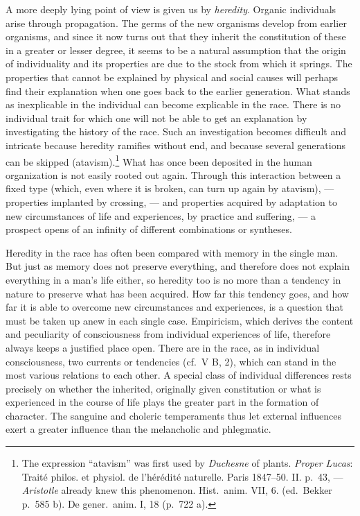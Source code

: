 \documentclass[12pt,a4paper]{book}
\newcommand{\opage}[1]{\marginnote{\footnotesize\textit{[#1]}}}
\begin{document}
A more deeply lying point of view is given us by \emph{heredity}. Organic
individuals arise through propagation. The germs of the new organisms
develop from earlier organisms, and since
\opage{408}it now turns out that they inherit the constitution of these
in a greater or lesser degree, it seems to be a natural assumption that
the origin of individuality and its properties are due to the stock from
which it springs. The properties that cannot be explained by physical and
social causes will perhaps find their explanation when one goes back to
the earlier generation. What stands as inexplicable in the individual can
become explicable in the race. There is no individual trait for which one
will not be able to get an explanation by investigating the history of
the race. Such an investigation becomes difficult and intricate because
heredity ramifies without end, and because several generations can be
skipped
(atavism).\footnote{The expression ``atavism'' was first used by
\emph{Duchesne} of plants. \emph{Proper Lucas}: Traité philos. et
physiol. de l’hérédité naturelle. Paris 1847--50. II. p.~43, ---
\emph{Aristotle} already knew this phenomenon. Hist.\ anim. VII, 6. (ed.\
Bekker p.~585 b). De gener.\ anim. I, 18 (p.~722 a).} What has once been
deposited in the human organization is not easily rooted out again.
Through this interaction between a fixed type (which, even where it is
broken, can turn up again by atavism), --- properties implanted by
crossing, --- and properties acquired by adaptation to new circumstances
of life and experiences, by practice and suffering, --- a prospect opens
of an infinity of different combinations or syntheses.

Heredity in the race has often been compared with memory in the single
man. But just as memory does not preserve everything, and therefore does
not explain everything in a man's life either, so heredity too is no more
than a tendency in nature to preserve what has been acquired. How far this
tendency goes, and how far it is able to overcome new circumstances and
experiences, is a question that must be taken up anew in each single
case. Empiricism, which derives the content and peculiarity of
consciousness from individual experiences of life, therefore always keeps
a justified place open. There are in the race, as in individual
consciousness, two currents or tendencies (cf.\ V B, 2), which can stand
in the most various relations to each other. A special class of
individual differences rests precisely
\opage{409}on whether the inherited, originally given constitution or what
is experienced in the course of life plays the greater part in the
formation of character. The sanguine and choleric temperaments thus let
external influences exert a greater influence than the melancholic and
phlegmatic.
\end{document}

